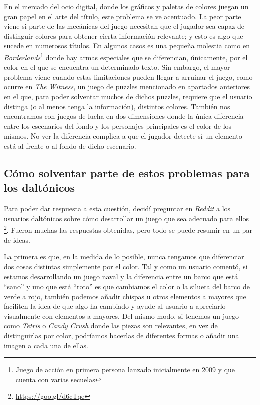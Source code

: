 En el mercado del ocio digital, donde los gráficos y paletas de colores juegan un gran papel en el arte del título, este problema se ve acentuado. La peor parte viene si parte de las mecánicas del juego necesitan que el jugador sea capaz de distinguir colores para obtener cierta información relevante; y esto es algo que sucede en numerosos títulos. En algunos casos es una pequeña molestia como en \textit{Borderlands}\footnote{Juego de acción en primera persona lanzado inicialmente en 2009 y que cuenta con varias secuelas} donde hay armas especiales que se diferencian, únicamente, por el color en el que se encuentra un determinado texto. Sin embargo, el mayor problema viene cuando estas limitaciones pueden llegar a arruinar el juego, como ocurre en \textit{The Witness}, un juego de puzzles mencionado en apartados anteriores en el que, para poder solventar muchos de dichos puzzles, requiere que el usuario distinga (o al menos tenga la información), distintos colores. 
También nos encontramos con juegos de lucha en dos dimensiones donde la única diferencia entre los escenarios del fondo y los personajes principales es el color de los mismos. No ver la diferencia complica a que el jugador detecte si un elemento está al frente o al fondo de dicho escenario.

\subsection{Cómo solventar parte de estos problemas para los daltónicos}

Para poder dar respuesta a esta cuestión, decidí preguntar en \textit{Reddit} a los usuarios daltónicos sobre cómo desarrollar un juego que sea adecuado para ellos \footnote{\url{https://goo.gl/d6cTqe}}. Fueron muchas las respuestas obtenidas, pero todo se puede resumir en un par de ideas.

La primera es que, en la medida de lo posible, nunca tengamos que diferenciar dos cosas distintas simplemente por el color. Tal y como un usuario comentó, si estamos desarrollando un juego naval y la diferencia entre un barco que está ``sano'' y uno que está ``roto'' es que cambiamos el color o la silueta del barco de verde a rojo, también podemos añadir chispas u otros elementos a mayores que faciliten la idea de que algo ha cambiado y ayude al usuario a apreciarlo visualmente con elementos a mayores. Del mismo modo, si tenemos un juego como \textit{Tetris} o \textit{Candy Crush} donde las piezas son relevantes, en vez de distinguirlas por color, podríamos hacerlas de diferentes formas o añadir una imagen a cada una de ellas.

